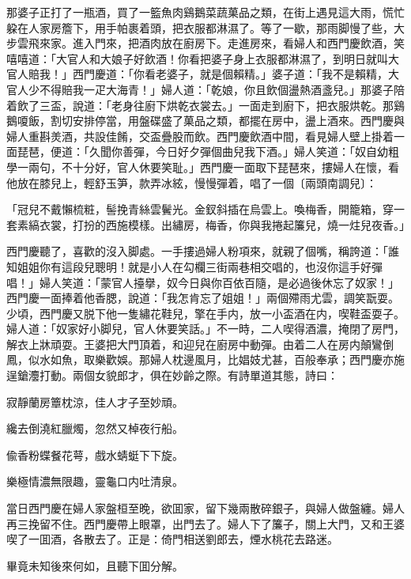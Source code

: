 那婆子正打了一瓶酒，買了一籃魚肉鷄鵝菜蔬菓品之類，在街上遇見這大雨，慌忙躱在人家房簷下，用手帕裹着頭，把衣服都淋濕了。等了一歇，那雨脚慢了些，大步雲飛來家。進入門來，把酒肉放在廚房下。走進房來，看婦人和西門慶飲酒，笑嘻嘻道：「大官人和大娘子好飲酒！你看把婆子身上衣服都淋濕了，到明日就叫大官人賠我！」西門慶道：「你看老婆子，就是個賴精。」婆子道：「我不是賴精，大官人少不得賠我一疋大海青！」婦人道：「乾娘，你且飲個盪熱酒盞兒。」那婆子陪着飲了三盃，說道：「老身往廚下烘乾衣裳去。」一面走到廚下，把衣服烘乾。那鷄鵝嗄飯，割切安排停當，用盤碟盛了菓品之類，都擺在房中，盪上酒來。西門慶與婦人重斟羙酒，共設佳餚，交盃疊股而飲。西門慶飲酒中間，看見婦人壁上掛着一面琵琶，便道：「久聞你善彈，今日好夕彈個曲兒我下酒。」婦人笑道：「奴自幼粗學一兩句，不十分好，官人休要笑耻。」西門慶一面取下琵琶來，摟婦人在懷，看他放在膝兒上，輕舒玉笋，款弄冰絃，慢慢彈着，唱了一個〔兩頭南調兒〕：
\begin{myquote}
「冠兒不戴懶梳粧，髻挽青絲雲鬢光。金釵斜插在烏雲上。喚梅香，開籠箱，穿一套素縞衣裳，打扮的西施模樣。出繡房，梅香，你與我捲起簾兒，燒一炷兒夜香。」
\end{myquote}

西門慶聽了，喜歡的沒入脚處。一手摟過婦人粉項來，就親了個嘴，稱誇道：「誰知姐姐你有這段兒聰明！就是小人在勾欄三街兩巷相交唱的，也沒你這手好彈唱！」婦人笑道：「蒙官人擡擧，奴今日與你百依百隨，是必過後休忘了奴家！」西門慶一面捧着他香腮，說道：「我怎肯忘了姐姐！」兩個殢雨尤雲，調笑翫耍。少頃，西門慶又脱下他一隻繡花鞋兒，擎在手内，放一小盃酒在内，喫鞋盃耍子。婦人道：「奴家好小脚兒，官人休要笑話。」不一時，二人喫得酒濃，掩閉了房門，解衣上牀頑耍。王婆把大門頂着，和迎兒在廚房中動彈。由着二人在房内顛鸞倒鳳，似水如魚，取樂歡娛。那婦人枕邊風月，比娼妓尤甚，百般奉承；西門慶亦施逞鎗灋打動。兩個女貌郎才，俱在妙齡之際。有詩單道其態，詩曰：
\begin{myquote}
寂靜蘭房簟枕涼，佳人才子至妙頑。

纔去倒澆紅臘燭，忽然又棹夜行船。

偸香粉蝶餐花萼，戲水蜻蜓下下旋。

樂極情濃無限趣，靈龜口内吐清泉。
\end{myquote}

當日西門慶在婦人家盤桓至晚，欲囬家，留下幾兩散碎銀子，與婦人做盤纏。婦人再三挽留不住。西門慶帶上眼罩，出門去了。婦人下了簾子，關上大門，又和王婆喫了一囬酒，各散去了。正是：倚門相送劉郎去，煙水桃花去路迷。

畢竟未知後來何如，且聽下囬分解。

